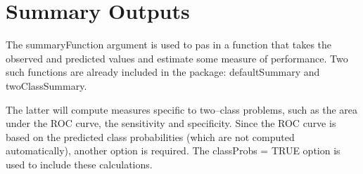 \section{Summary Outputs}
The summaryFunction argument is used to pas in a function that takes the observed and predicted
values and estimate some measure of performance. Two such functions are already included in the
package: defaultSummary and twoClassSummary. 

The latter will compute measures speciﬁc to two–class
problems, such as the area under the ROC curve, the sensitivity and speciﬁcity. Since the ROC
curve is based on the predicted class probabilities (which are not computed automatically), another
option is required. The classProbs = TRUE option is used to include these calculations.



